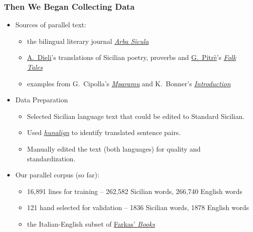 \documentclass{beamer}
\begin{document}
\begin{frame}
  \frametitle{Then We Began Collecting Data}
  \vspace{-1.0em}
  \begin{itemize}
  \item Sources of parallel text:
    \begin{itemize}
    \item the bilingual literary journal \href{https://www.arbasicula.org/}{\textit{Arba Sicula}}
    \item \href{http://www.dieli.net/}{A.~Dieli}'s translations of Sicilian poetry, proverbs and \href{https://en.wikipedia.org/wiki/Giuseppe_Pitr\%C3\%A8}{G.~Pitrè}'s \href{https://scn.wikipedia.org/wiki/F\%C3\%A0uli,_nueddi_e_cunti_pupulari_siciliani}{\textit{Folk Tales}}
    \item examples from G.~Cipolla's \href{http://www.arbasicula.org/LegasOnlineStore.html\#!/26-Learn-Sicilian-Mparamu-lu-sicilianu-by-Gaetano-Cipolla/p/82865121/category=0}{\textit{Mparamu}} and K.~Bonner's \href{http://www.arbasicula.org/LegasOnlineStore.html\#!/28-An-Introduction-to-Sicilian-Grammar-by-J-K-Kirk-Bonner-Edited-by-Gaetano-Cipolla/p/82865123/category=0}{\textit{Introduction}}
   \end{itemize}
  \vspace{0.5em}
  \item Data Preparation
    \begin{itemize}
    \item Selected Sicilian language text that could be edited to Standard Sicilian.
    \item Used \href{https://github.com/danielvarga/hunalign}{\textit{hunalign}} to identify translated sentence pairs.
    \item Manually edited the text (both languages) for quality and standardization.
    \end{itemize}
  \vspace{0.5em}
  \item Our parallel corpus (so far):
    \begin{itemize}
    \item 16,891 lines for training -- 262,582 Sicilian words, 266,740 English words
    \item 121 hand selected for validation -- 1836 Sicilian words, 1878 English words
    \item the Italian-English subset of \href{https://farkastranslations.com/bilingual_books.php}{Farkas' \textit{Books}}
    \end{itemize}
  \end{itemize} 
\end{frame}
\end{document}
